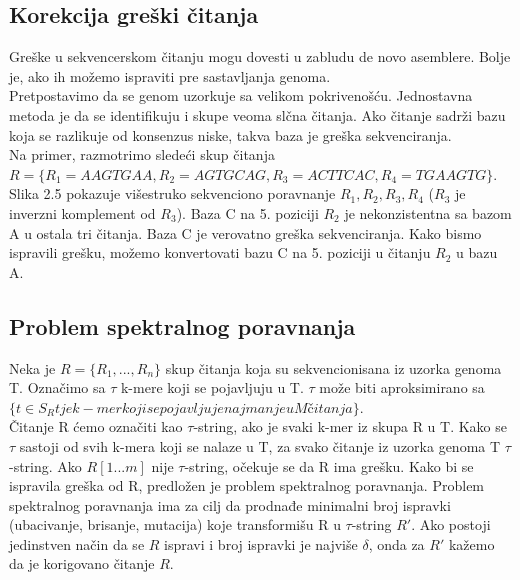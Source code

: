 \documentclass{article}
\begin{document}
\subsection{Korekcija greški čitanja}

Greške u sekvencerskom čitanju mogu dovesti u zabludu de novo asemblere. Bolje je, ako ih možemo ispraviti pre sastavljanja genoma.\\

Pretpostavimo da se genom uzorkuje sa velikom pokrivenošću. Jednostavna metoda je da se identifikuju i skupe veoma slčna čitanja. Ako čitanje sadrži bazu koja se razlikuje od konsenzus niske, takva baza je greška sekvenciranja.\\

Na primer, razmotrimo sledeći skup čitanja $R = \{R_1 = AAGTGAA, R_2 = AGTGCAG, R_3 = ACTTCAC, R_4 = TGAAGTG\}$. Slika 2.5 pokazuje višestruko sekvenciono poravnanje $R_1, R_2, R_3, R_4$ ($R_3$ je inverzni komplement od $R_3$). Baza C na 5. poziciji $R_2$ je nekonzistentna sa bazom A u ostala tri čitanja. Baza C je verovatno greška sekvenciranja. Kako bismo ispravili grešku, možemo konvertovati bazu C na 5. poziciji u čitanju $R_2$ u bazu A.

\subsection{Problem spektralnog poravnanja}

Neka je $R = \{R_1, . . . , R_n\}$ skup čitanja koja su sekvencionisana iz uzorka genoma T. Označimo sa $\tau$ k-mere koji se pojavljuju u T. $\tau$ može biti aproksimirano sa $\{t \in S_R $\vert$ t je k-mer koji se pojavljuje najmanje u M čitanja\}$.\\

Čitanje R ćemo označiti kao $\tau$-string, ako je svaki k-mer iz skupa R u T. Kako se $\tau$ sastoji od svih k-mera koji se nalaze u T, za svako čitanje iz uzorka genoma T $\tau$-string. Ako $R[1...m]$ nije $\tau$-string, očekuje se da R ima grešku. Kako bi se ispravila greška od R, predložen je problem spektralnog poravnanja. Problem spektralnog poravnanja ima za cilj da prodnađe minimalni broj ispravki (ubacivanje, brisanje, mutacija) koje transformišu R u $\tau$-string $R'$. Ako postoji jedinstven način da se $R$ ispravi i broj ispravki je najviše $\delta$, onda za $R'$ kažemo da je korigovano čitanje $R$.\\
\end{document}
